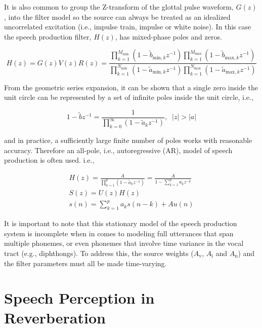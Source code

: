 It is also common to group the Z-transform of the glottal pulse waveform, $G(z)$, into the filter model so the source can always be treated as an idealized uncorrelated excitation (i.e., impulse train, impulse or white noise). In this case the speech production filter, $H(z)$, has mixed-phase poles and zeros.

\begin{equation}
	H(z) = G(z)V(z)R(z) = 
	\frac
	{\prod_{k=1}^{M_{\mathrm{min}}}(1-\tilde{b}_{\mathrm{min},k}z^{-1})
		\prod_{k=1}^{M_{\mathrm{max}}}(1-\tilde{b}_{\mathrm{max},k}z^{-1})}
	{\prod_{k=1}^{N_{\mathrm{min}}}(1-\tilde{a}_{\mathrm{min},k} z^{-1})
		\prod_{k=1}^{N_{\mathrm{max}}}(1-\tilde{a}_{\mathrm{max},k} z^{-1})}
\end{equation}

From the geometric series expansion, it can be shown that a single zero inside the unit circle can be represented by a set of infinite poles inside the unit circle, i.e.,

\begin{equation}
	1-\tilde{b}z^{-1} = \frac{1}{\prod_{k=0}^{\infty}(1-\tilde{a}_k z^{-1})}, \;\; |z| > |a| \label{eq:zero_approx}
\end{equation}

\noindent
and in practice, a sufficiently large finite number of poles works with reasonable accuracy. Therefore an all-pole, i.e., autoregressive (AR), model of speech production is often used. i.e.,

\begin{eqnarray}
	H(z) = \frac{A}{\prod_{k=1}^{p}(1-\tilde{a}_k z^{-1})} = \frac{A}{1 - \sum_{k=1}^{p} a_k z^{-k}}\\
	S(z)=U(z)H(z) \\
	s(n) = \sum_{k=1}^{p}a_k s(n-k) + A u(n) \label{eq:AR_speech}
\end{eqnarray}

It is important to note that this stationary model of the speech production system is incomplete when in comes to modeling full utterances that span multiple phonemes, or even phonemes that involve time variance in the vocal tract (e.g., diphthongs). To address this, the source weights ($A_\mathrm{v}$, $A_\mathrm{i}$ and $A_\mathrm{n}$) and the filter parameters must all be made time-varying.

\section{Speech Perception in Reverberation}


